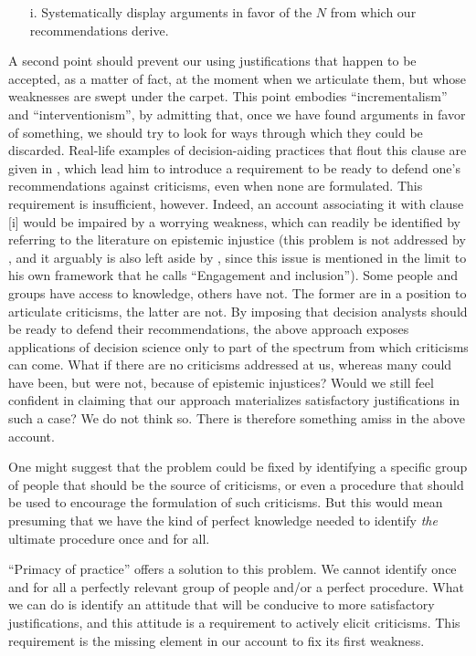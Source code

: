 \documentclass[preprint, french, english, 11pt, authoryear]{elsarticle}%
\begin{document}
\begin{itemize}
\item[i.]	Systematically display arguments in favor of the $N$ from which our recommendations derive.
\end{itemize}
A second point should prevent our using justifications that happen to be accepted, as a matter of fact, at the moment when we articulate them, but whose weaknesses are swept under the carpet. This point embodies “incrementalism” and ``interventionism'', by admitting that, once we have found arguments in favor of something, we should try to look for ways through which they could be discarded. Real-life examples of decision-aiding practices that flout this clause are given in \cite{meinard_what_2017}, which lead him to introduce a requirement to be ready to defend one's recommendations against criticisms, even when none are formulated. This requirement is insufficient, however. Indeed, an account associating it with clause [i] would be impaired by a worrying weakness, which can readily be identified by referring to the literature on epistemic injustice \citep{fricker_epistemic_2007} (this problem is not addressed by \cite{meinard_what_2017}, and it arguably is also left aside by \cite{mingers_ethics_2011}, since this issue is mentioned in the limit to his own framework that he calls ``Engagement and inclusion''). Some people and groups have access to knowledge, others have not. The former are in a position to articulate criticisms, the latter are not. By imposing that decision analysts should be ready to defend their recommendations, the above approach exposes applications of decision science only to part of the spectrum from which criticisms can come. What if there are no criticisms addressed at us, whereas many could have been, but were not, because of epistemic injustices? Would we still feel confident in claiming that our approach materializes satisfactory justifications in such a case? We do not think so. There is therefore something amiss in the above account.

One might suggest that the problem could be fixed by identifying a specific group of people that should be the source of criticisms, or even a procedure that should be used to encourage the formulation of such criticisms. But this would mean presuming that we have the kind of perfect knowledge needed to identify \emph{the} ultimate procedure once and for all.

``Primacy of practice” offers a solution to this problem. We cannot identify once and for all a perfectly relevant group of people and/or a perfect procedure. What we can do is identify an attitude that will be conducive to more satisfactory justifications, and this attitude is a requirement to actively elicit criticisms. This requirement is the missing element in our account to fix its first weakness.
\end{document}
